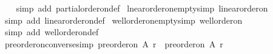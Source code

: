 \begin{isabellebody}
%
\isadelimproof
\ \ %
\endisadelimproof
%
\isatagproof
{}\isamarkupfalse%
\ {\isacharparenleft}{\kern0pt}simp\ add{\isacharcolon}{\kern0pt}\ partial{\isacharunderscore}{\kern0pt}order{\isacharunderscore}{\kern0pt}on{\isacharunderscore}{\kern0pt}def{\isacharparenright}{\kern0pt}%
\endisatagproof
{\isafoldproof}%
%
\isadelimproof
\isanewline
%
\endisadelimproof
\isanewline
{}\isamarkupfalse%
\ lnear{\isacharunderscore}{\kern0pt}order{\isacharunderscore}{\kern0pt}on{\isacharunderscore}{\kern0pt}empty{\isacharbrackleft}{\kern0pt}simp{\isacharbrackright}{\kern0pt}{\isacharcolon}{\kern0pt}\ {\isachardoublequoteopen}linear{\isacharunderscore}{\kern0pt}order{\isacharunderscore}{\kern0pt}on\ {\isacharbraceleft}{\kern0pt}{\isacharbraceright}{\kern0pt}\ {\isacharbraceleft}{\kern0pt}{\isacharbraceright}{\kern0pt}{\isachardoublequoteclose}\isanewline
%
\isadelimproof
\ \ %
\endisadelimproof
%
\isatagproof
{}\isamarkupfalse%
\ {\isacharparenleft}{\kern0pt}simp\ add{\isacharcolon}{\kern0pt}\ linear{\isacharunderscore}{\kern0pt}order{\isacharunderscore}{\kern0pt}on{\isacharunderscore}{\kern0pt}def{\isacharparenright}{\kern0pt}%
\endisatagproof
{\isafoldproof}%
%
\isadelimproof
\isanewline
%
\endisadelimproof
\isanewline
{}\isamarkupfalse%
\ well{\isacharunderscore}{\kern0pt}order{\isacharunderscore}{\kern0pt}on{\isacharunderscore}{\kern0pt}empty{\isacharbrackleft}{\kern0pt}simp{\isacharbrackright}{\kern0pt}{\isacharcolon}{\kern0pt}\ {\isachardoublequoteopen}well{\isacharunderscore}{\kern0pt}order{\isacharunderscore}{\kern0pt}on\ {\isacharbraceleft}{\kern0pt}{\isacharbraceright}{\kern0pt}\ {\isacharbraceleft}{\kern0pt}{\isacharbraceright}{\kern0pt}{\isachardoublequoteclose}\isanewline
%
\isadelimproof
\ \ %
\endisadelimproof
%
\isatagproof
{}\isamarkupfalse%
\ {\isacharparenleft}{\kern0pt}simp\ add{\isacharcolon}{\kern0pt}\ well{\isacharunderscore}{\kern0pt}order{\isacharunderscore}{\kern0pt}on{\isacharunderscore}{\kern0pt}def{\isacharparenright}{\kern0pt}%
\endisatagproof
{\isafoldproof}%
%
\isadelimproof
\isanewline
%
\endisadelimproof
\isanewline
\isanewline
{}\isamarkupfalse%
\ preorder{\isacharunderscore}{\kern0pt}on{\isacharunderscore}{\kern0pt}converse{\isacharbrackleft}{\kern0pt}simp{\isacharbrackright}{\kern0pt}{\isacharcolon}{\kern0pt}\ {\isachardoublequoteopen}preorder{\isacharunderscore}{\kern0pt}on\ A\ {\isacharparenleft}{\kern0pt}r{\isasyminverse}{\isacharparenright}{\kern0pt}\ {\isacharequal}{\kern0pt}\ preorder{\isacharunderscore}{\kern0pt}on\ A\ r{\isachardoublequoteclose}\isanewline

\end{isabellebody}
